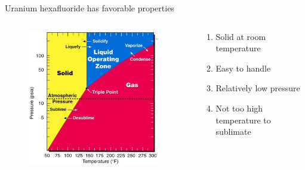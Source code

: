 \documentclass[aspectratio=1610,pdftex,dvipsnames,compress,xcolor={dvipsnames}]{beamer}
\begin{document}
\begin{frame}{Uranium hexafluoride has favorable properties}
    \begin{columns}

        \begin{column}{0.45\textwidth}
            \begin{figure}
                \centering
                \includegraphics[width=0.95\textwidth]{uf6.phase.diagram.jpg}
            \end{figure}
        \end{column}

        \begin{column}{0.55\textwidth}
            \begin{enumerate}[series=outerlist,topsep=0pt,itemsep=21pt,leftmargin=*,label=(\arabic*)]
                \item[]Solid at room temperature
                \item[]Easy to handle
                \item[]Relatively low pressure
                \item[]Not too high temperature to sublimate
            \end{enumerate}
        \end{column}

    \end{columns}
\end{frame}
\end{document}
